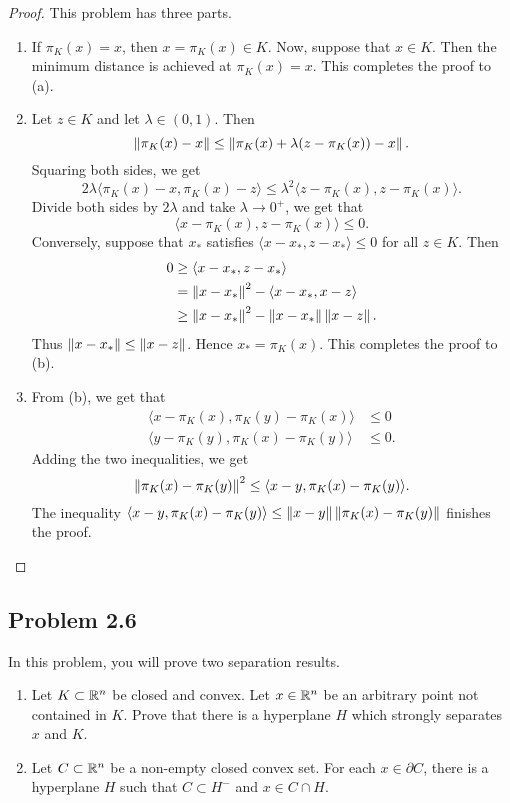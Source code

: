 \documentclass[12pt]{article}
\begin{document}
\begin{proof}
	This problem has three parts. 
	\begin{enumerate}[label = (\alph*)]
		\item If $\pi_K(x) = x$, then $x = \pi_K(x) \in K$. Now, suppose that $x \in K$. Then the minimum distance is achieved at $\pi_K(x) = x$. This completes the proof to (a). 

		\item Let $z \in K$ and let $\lambda \in (0, 1)$. Then 
		\[
			\left\lVert\pi_K(x) - x\right\rVert \leq \left\lVert\pi_K(x) + \lambda (z - \pi_K(x)) - x\right\rVert.
		\]
		Squaring both sides, we get 
		\[
			2\lambda \langle \pi_K(x) - x, \pi_K(x) - z \rangle \leq \lambda^2 \langle z - \pi_K(x), z - \pi_K(x) \rangle. 
		\]
		Divide both sides by $2\lambda$ and take $\lambda \to 0^+$, we get that 
		\[
			\langle x - \pi_K(x), z - \pi_K(x) \rangle \leq 0. 
		\]
		Conversely, suppose that $x_*$ satisfies $\langle x - x_*, z - x_* \rangle \leq 0$ for all $z \in K$. Then 
		\begin{align*}
			0 & \geq \langle x- x_*, z - x_* \rangle \\
			& = \left\lVert x - x_*\right\rVert^2 - \langle x - x_*, x - z \rangle \\
			& \geq \left\lVert x - x_*\right\rVert^2 - \left\lVert x-x_*\right\rVert \left\lVert x-z\right\rVert.
		\end{align*}
		Thus $\left\lVert x - x_*\right\rVert \leq \left\lVert x - z\right\rVert$. Hence $x_* = \pi_K(x)$. This completes the proof to (b). 

		\item From (b), we get that 
		\begin{align*}
			\langle x - \pi_K(x), \pi_K(y) - \pi_K(x) \rangle & \leq 0 \\
			\langle y - \pi_K(y), \pi_K(x) - \pi_K(y) \rangle & \leq 0.
		\end{align*}
		Adding the two inequalities, we get 
		\[
			\left\lVert\pi_K(x) - \pi_K(y)\right\rVert^2 \leq \langle x - y, \pi_K(x) - \pi_K(y) \rangle. 
		\]
		The inequality $\langle x - y, \pi_K(x) - \pi_K(y) \rangle \leq \left\lVert x-y\right\rVert \left\lVert\pi_K(x) - \pi_K(y)\right\rVert$ finishes the proof.  
	\end{enumerate}
\end{proof}

\newpage 

\subsection{Problem 2.6}

\begin{problem}
	In this problem, you will prove two separation results. 
\begin{enumerate}[label = (\alph*)]
    \item Let $K \subset \mathbb{R}^n$ be closed and convex. Let $x \in \mathbb{R}^n$ be an arbitrary point not contained in $K$. Prove that there is a hyperplane $H$ which strongly separates $x$ and $K$.
    \item Let $C \subset \mathbb{R}^n$ be a non-empty closed convex set. For each $x \in \partial C$, there is a hyperplane $H$ such that $C \subset H^-$ and $x \in C \cap H$. 
\end{enumerate} 
\end{problem}
\end{document}
